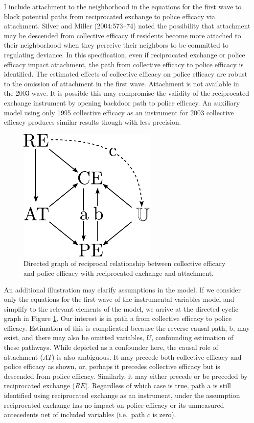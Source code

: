 \documentclass [11pt, proquest] {uwthesis}[2015/03/03]
\begin{document}
I include attachment to the neighborhood in the equations for the first wave to block potential paths from reciprocated exchange to police efficacy via attachment. Silver and Miller (2004:573--74) noted the possibility that attachment may be descended from collective efficacy if residents become more attached to their neighborhood when they perceive their neighbors to be committed to regulating deviance. In this specification, even if reciprocated exchange or police efficacy impact attachment, the path from collective efficacy to police efficacy is identified. The estimated effects of collective efficacy on police efficacy are robust to the omission of attachment in the first wave. Attachment is not available in the 2003 wave. It is possible this may compromise the validity of the reciprocated exchange instrument by opening backdoor path to police efficacy. An auxiliary model using only 1995 collective efficacy as an instrument for 2003 collective efficacy produces similar results though with less precision.\linebreak
\linebreak
\begin{figure}

{\centering \includegraphics[width=0.4\linewidth]{./figure/ch3/nr_dag} 

}

\caption{Directed graph of reciprocal relationship between collective efficacy and police efficacy with reciprocated exchange and attachment.}\label{fig:nrdag}
\end{figure}
An additional illustration may clarify assumptions in the model. If we consider only the equations for the first wave of the instrumental variables model and simplify to the relevant elements of the model, we arrive at the directed cyclic graph in Figure \ref{fig:nrdag}. Our interest is in path a from collective efficacy to police efficacy. Estimation of this is complicated because the reverse causal path, b, may exist, and there may also be omitted variables, \(U\), confounding estimation of these pathways. While depicted as a confounder here, the causal role of attachment (\(AT\)) is also ambiguous. It may precede both collective efficacy and police efficacy as shown, or, perhaps it precedes collective efficacy but is descended from police efficacy. Similarly, it may either precede or be preceded by reciprocated exchange (\(RE\)). Regardless of which case is true, path a is still identified using reciprocated exchange as an instrument, under the assumption reciprocated exchange has no impact on police efficacy or its unmeasured antecedents net of included variables (i.e.~path \(c\) is zero).
\end{document}
